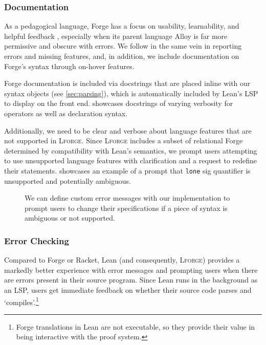 \subsubsection{Documentation}

As a pedagogical language, Forge has a focus on usability, learnability, and helpful feedback \cite{ngpdbccdlrrvwwk-oopsla-2024}, especially when its parent language Alloy is far more permissive and obscure with errors. We follow in the same vein in reporting errors and missing features, and, in addition, we include documentation on Forge's syntax through on-hover features. 

Forge documentation is included via docstrings that are placed inline with our syntax objects (see \cref{sec:parsing}), which is automatically included by Lean's LSP to display on the front end.  showcases docstrings of varying verbosity for operators as well as declaration syntax. 

Additionally, we need to be clear and verbose about language features that are not supported in \textsc{Lforge}. Since \textsc{Lforge} includes a subset of relational Forge determined by compatibility with Lean's semantics, we prompt users attempting to use unsupported language features with clarification and a request to redefine their statements.  showcases an example of a prompt that \texttt{lone} sig quantifier is unsupported and potentially ambiguous. 

\begin{figure}[h!]
  \centering
  \caption{We can define custom error messages with our implementation to prompt users to change their specifications if a piece of syntax is ambiguous or not supported.}
  \label{fig:sc-unsupported}
\end{figure}

\subsubsection{Error Checking}

Compared to Forge or Racket, Lean (and consequently, \textsc{Lforge}) provides a markedly better experience with error messages and prompting users when there are errors present in their source program. Since Lean runs in the background as an LSP, users get immediate feedback on whether their source code parses and `compiles'.\footnote{Forge translations in Lean are not executable, so they provide their value in being interactive with the proof system.}

